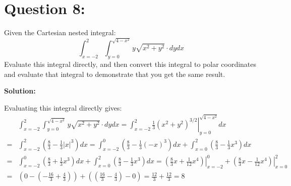 \documentclass{article}
\newcommand{\abs}[1]{\left|#1\right|}
\newcommand{\at}[1]{\left. #1 \right|}
\newcommand{\dr}[1]{\textcolor{dark_red}{#1}}
\begin{document}
\section*{Question 8:}

Given the Cartesian nested integral:
\[\int_{x = -2}^2 \int_{y = 0}^{\sqrt{4-x^2}} y\sqrt{x^2 + y^2} \cdot dydx\]
Evaluate this integral directly, and then convert this integral to polar coordinates and evaluate that integral to demonstrate that you get the same result.

\vspace{5mm}
\dr{\textbf{Solution:}}

\dr{
Evaluating this integral directly gives:
\begin{align*}
& \int_{x = -2}^2 \int_{y = 0}^{\sqrt{4-x^2}} y\sqrt{x^2 + y^2} \cdot dydx 
= \int_{x = -2}^2 \at{\frac{1}{3}(x^2 + y^2)^{3/2}}_{y = 0}^{\sqrt{4-x^2}} dx \\
= & \int_{x = -2}^2 (\frac{8}{3} - \frac{1}{3}\abs{x}^3) dx 
= \int_{x = -2}^0 (\frac{8}{3} - \frac{1}{3}(-x)^3) dx + \int_{x = 0}^2 (\frac{8}{3} - \frac{1}{3}x^3) dx \\
= & \int_{x = -2}^0 (\frac{8}{3} + \frac{1}{3}x^3) dx + \int_{x = 0}^2 (\frac{8}{3} - \frac{1}{3}x^3) dx
= \at{(\frac{8}{3}x + \frac{1}{12}x^4)}_{x = -2}^0 + \at{(\frac{8}{3}x - \frac{1}{12}x^4)}_{x = 0}^2 \\
= & (0 - (-\frac{16}{3} + \frac{4}{3})) + ((\frac{16}{3} - \frac{4}{3}) - 0) 
= \frac{12}{3} + \frac{12}{3} 
= 8
\end{align*}
}
\end{document}
